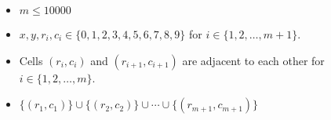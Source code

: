 \begin{itemize}
\tightlist
\item $m\le 10000$
\item $x,y,r_i,c_i\in\{0,1,2,3,4,5,6,7,8,9\}$ for $i\in\{1,2,\ldots,m+1\}$. 
\item Cells $(r_i,c_i)$ and $(r_{i+1},c_{i+1})$ are adjacent to each other 
      for $i\in\{1,2,\ldots,m\}$.
\item $\{(r_1,c_1)\}\cup\{(r_2,c_2)\}\cup\cdots\cup\{(r_{m+1},c_{m+1})\}$
\end{itemize}

